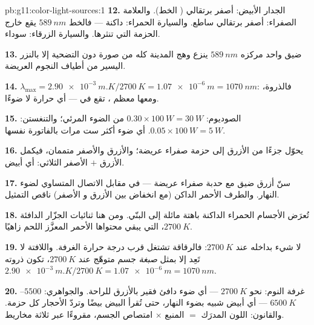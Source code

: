 \begin{solution}{pb:g11:color-light-sources:1}
\textbf{12.} الجدار الأبيض: أصفر برتقالي ( الخط). والعلامة
الصفراء: أصفر برتقالي ساطع. والسيارة الحمراء: داكنة --- فالخط $\qty{589}{nm}$
يقع خارج الحزمة التي تنثرها. والسيارة الزرقاء: سوداء.

\textbf{13.}  ضيق واحد مركزه $\qty{589}{nm}$ ينزع
وهج المدينة كله من صورة دون التضحية إلا بالنزر اليسير من
أطياف النجوم العريضة.

\textbf{14.} $\lambda_{\max} = \qty{2.90e-3}{m.K}/\qty{2700}{K} =
\qty{1.07e-6}{m} = \qty{1070}{nm}$: فالذروة، ومعها معظم ،
تقع في  --- أي حرارة لا ضوءًا.

\textbf{15.} الصوديوم: $0.30 \times \qty{100}{W} = \qty{30}{W}$ من
الضوء المرئي؛ والتنغستن: $0.05 \times \qty{100}{W} = \qty{5}{W}$. أي ضوء أكثر ست
مرات بالفاتورة نفسها.

\textbf{16.} يحوّل  جزءًا من الأزرق إلى حزمة صفراء
عريضة؛ والأزرق والأصفر متممان، فيكمل الأزرق $+$ الأصفر
الثلاثي: أي أبيض.

\textbf{17.} سنّ أزرق ضيق مع حدبة صفراء عريضة --- في مقابل
الاتصال المتساوي لضوء النهار. والطرف الأحمر الداكن (مع انخفاض بين الأزرق و
الأصفر) ناقص التمثيل.

\textbf{18.} تُعرَض الأجسام الحمراء الداكنة باهتة مائلة إلى البنّي. ومن هنا
ثنائيات الجزّار الدافئة $\qty{2700}{K}$، التي يبقي محتواها الأحمر المعزَّز
اللحم زاهيًا.

\textbf{19.} لا شيء بداخله عند $\qty{2700}{K}$: فالرقاقة تشتغل قرب
درجة حرارة الغرفة. واللافتة لا تَعِد إلا بمثل \emph{صبغة} جسم
متوهّج عند $\qty{2700}{K}$، تكون ذروته
$\qty{2.90e-3}{m.K}/\qty{2700}{K} = \qty{1.07e-6}{m} = \qty{1070}{nm}$.

\textbf{20.} غرفة النوم: نحو $\qty{2700}{K}$ --- أي ضوء دافئ فقير بالأزرق
للراحة. والجواهري: $5500$--$\qty{6500}{K}$ --- أي أبيض شبيه بضوء النهار، حتى
تُقرأ البيض بيضًا وتردّ الأحجار كل حزمة. والقانون: اللون
المدرَك $=$  المنبع $\times$ امتصاص الجسم، مقروءًا عبر
ثلاثة مخاريط.
\end{solution}
